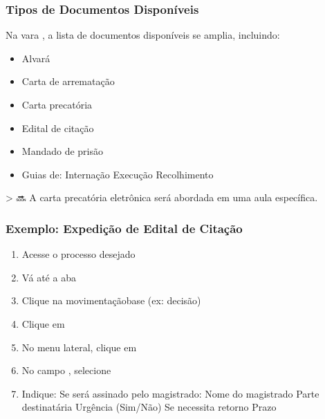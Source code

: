 \documentclass[letterpaper,10pt,brazil]{sphinxmanual}
\begin{document}
\subsubsection{Tipos de Documentos Disponíveis}
\label{\detokenize{projud_33_ordenarcumprimento:tipos-de-documentos-disponiveis}}
\sphinxAtStartPar
Na vara , a lista de documentos disponíveis se amplia, incluindo:
\begin{itemize}
\item {} 
\sphinxAtStartPar
Alvará

\item {} 
\sphinxAtStartPar
Carta de arrematação

\item {} 
\sphinxAtStartPar
Carta precatória

\item {} 
\sphinxAtStartPar
Edital de citação

\item {} 
\sphinxAtStartPar
Mandado de prisão

\item {} 
\sphinxAtStartPar
Guias de:
\sphinxhyphen{} Internação
\sphinxhyphen{} Execução
\sphinxhyphen{} Recolhimento

\end{itemize}

\sphinxAtStartPar
\textgreater{} 🔜 A carta precatória eletrônica será abordada em uma aula específica.


\subsubsection{Exemplo: Expedição de Edital de Citação}
\label{\detokenize{projud_33_ordenarcumprimento:exemplo-expedicao-de-edital-de-citacao}}\begin{enumerate}
%
\item {} 
\sphinxAtStartPar
Acesse o processo desejado

\item {} 
\sphinxAtStartPar
Vá até a aba 

\item {} 
\sphinxAtStartPar
Clique na movimentação\sphinxhyphen{}base (ex: decisão)

\item {} 
\sphinxAtStartPar
Clique em 

\item {} 
\sphinxAtStartPar
No menu lateral, clique em 

\item {} 
\sphinxAtStartPar
No campo , selecione 

\item {} 
\sphinxAtStartPar
Indique:
\sphinxhyphen{} Se será assinado pelo magistrado: 
\sphinxhyphen{} Nome do magistrado
\sphinxhyphen{} Parte destinatária
\sphinxhyphen{} Urgência (Sim/Não)
\sphinxhyphen{} Se necessita retorno
\sphinxhyphen{} Prazo

\end{enumerate}
\end{document}

